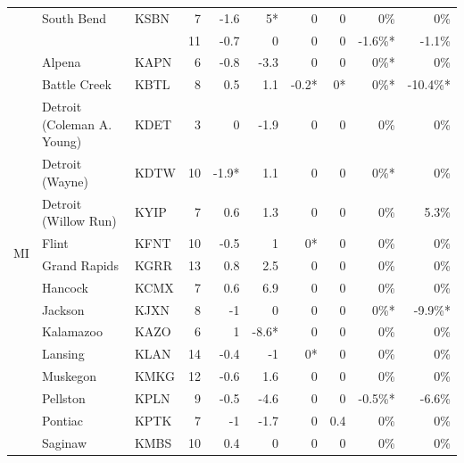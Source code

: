 \documentclass[twocol]{ametsoc}
\begin{document}
\begin{landscape}
\begin{table}[]
\begin{tabular}{cllrrrrrrr}
                     & South Bend                 & KSBN & 7    & -1.6  & 5*    & 0     & 0    & 0\%     & 0\%      \\ \cline{2-10} 
                     &                            &      & 11   & -0.7  & 0     & 0     & 0    & -1.6\%* & -1.1\%   \\ \hline
\multirow{17}{*}{MI} & Alpena                     & KAPN & 6    & -0.8  & -3.3  & 0     & 0    & 0\%*    & 0\%      \\
                     & Battle Creek               & KBTL & 8    & 0.5   & 1.1   & -0.2* & 0*   & 0\%*    & -10.4\%* \\
                     & Detroit (Coleman A. Young) & KDET & 3    & 0     & -1.9  & 0     & 0    & 0\%     & 0\%      \\
                     & Detroit (Wayne)            & KDTW & 10   & -1.9* & 1.1   & 0     & 0    & 0\%*    & 0\%      \\
                     & Detroit (Willow Run)       & KYIP & 7    & 0.6   & 1.3   & 0     & 0    & 0\%     & 5.3\%    \\
                     & Flint                      & KFNT & 10   & -0.5  & 1     & 0*    & 0    & 0\%     & 0\%      \\
                     & Grand Rapids               & KGRR & 13   & 0.8   & 2.5   & 0     & 0    & 0\%     & 0\%      \\
                     & Hancock                    & KCMX & 7    & 0.6   & 6.9   & 0     & 0    & 0\%     & 0\%      \\
                     & Jackson                    & KJXN & 8    & -1    & 0     & 0     & 0    & 0\%*    & -9.9\%*  \\
                     & Kalamazoo                  & KAZO & 6    & 1     & -8.6* & 0     & 0    & 0\%     & 0\%      \\
                     & Lansing                    & KLAN & 14   & -0.4  & -1    & 0*    & 0    & 0\%     & 0\%      \\
                     & Muskegon                   & KMKG & 12   & -0.6  & 1.6   & 0     & 0    & 0\%     & 0\%      \\
                     & Pellston                   & KPLN & 9    & -0.5  & -4.6  & 0     & 0    & -0.5\%* & -6.6\%   \\
                     & Pontiac                    & KPTK & 7    & -1    & -1.7  & 0     & 0.4  & 0\%     & 0\%      \\
                     & Saginaw                    & KMBS & 10   & 0.4   & 0     & 0     & 0    & 0\%     & 0\%      \\

\end{tabular}
\end{table}
\end{landscape}
\end{document}
